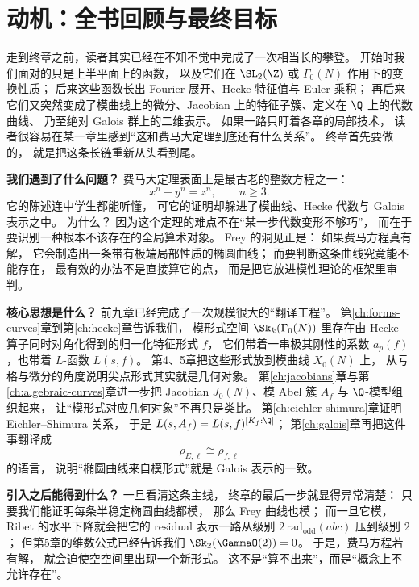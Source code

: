 \section{动机：全书回顾与最终目标}
\label{sec:ch10-motivation}

走到终章之前，读者其实已经在不知不觉中完成了一次相当长的攀登。
开始时我们面对的只是上半平面上的函数，
以及它们在 $\SL_2(\Z)$ 或 $\Gamma_0(N)$ 作用下的变换性质；
后来这些函数长出 Fourier 展开、Hecke 特征值与 Euler 乘积；
再后来它们又突然变成了模曲线上的微分、Jacobian 上的特征子簇、定义在 $\Q$ 上的代数曲线、
乃至绝对 Galois 群上的二维表示。
如果一路只盯着各章的局部技术，
读者很容易在某一章里感到“这和费马大定理到底还有什么关系”。
终章首先要做的，
就是把这条长链重新从头看到尾。

\textbf{我们遇到了什么问题？}
费马大定理表面上是最古老的整数方程之一：
\[
  x^n+y^n=z^n,
  \qquad n\ge 3.
\]
它的陈述连中学生都能听懂，
可它的证明却躲进了模曲线、Hecke 代数与 Galois 表示之中。
为什么？
因为这个定理的难点不在“某一步代数变形不够巧”，
而在于要识别一种根本不该存在的全局算术对象。
Frey 的洞见正是：
如果费马方程真有解，
它会制造出一条带有极端局部性质的椭圆曲线；
而要判断这条曲线究竟能不能存在，
最有效的办法不是直接算它的点，
而是把它放进模性理论的框架里审判。

\textbf{核心思想是什么？}
前九章已经完成了一次规模很大的“翻译工程”。
第\ref{ch:forms-curves}章到第\ref{ch:hecke}章告诉我们，
模形式空间 $\Sk_k(\Gamma_0(N))$ 里存在由 Hecke 算子同时对角化得到的归一化特征形式 $f$，
它们带着一串极其刚性的系数 $a_p(f)$，也带着 $L$-函数 $L(s,f)$。
第4、5章把这些形式放到模曲线 $X_0(N)$ 上，
从亏格与微分的角度说明尖点形式其实就是几何对象。
第\ref{ch:jacobians}章与第\ref{ch:algebraic-curves}章进一步把 Jacobian $J_0(N)$、模 Abel 簇 $A_f$ 与 $\Q$-模型组织起来，
让“模形式对应几何对象”不再只是类比。
第\ref{ch:eichler-shimura}章证明 Eichler--Shimura 关系，
于是 $L(s,A_f)=L(s,f)^{[K_f:\Q]}$；
第\ref{ch:galois}章再把这件事翻译成
\[
  \rho_{E,\ell}\cong \rho_{f,\ell}
\]
的语言，
说明“椭圆曲线来自模形式”就是 Galois 表示的一致。

\textbf{引入之后能得到什么？}
一旦看清这条主线，
终章的最后一步就显得异常清楚：
只要我们能证明每条半稳定椭圆曲线都模，
那么 Frey 曲线也模；
而一旦它模，Ribet 的水平下降就会把它的 residual 表示一路从级别 $2\,\mathrm{rad}_{\mathrm{odd}}(abc)$ 压到级别 $2$；
但第5章的维数公式已经告诉我们 $\Sk_2(\GammaO(2))=0$。
于是，费马方程若有解，
就会迫使空空间里出现一个新形式。
这不是“算不出来”，而是“概念上不允许存在”。


